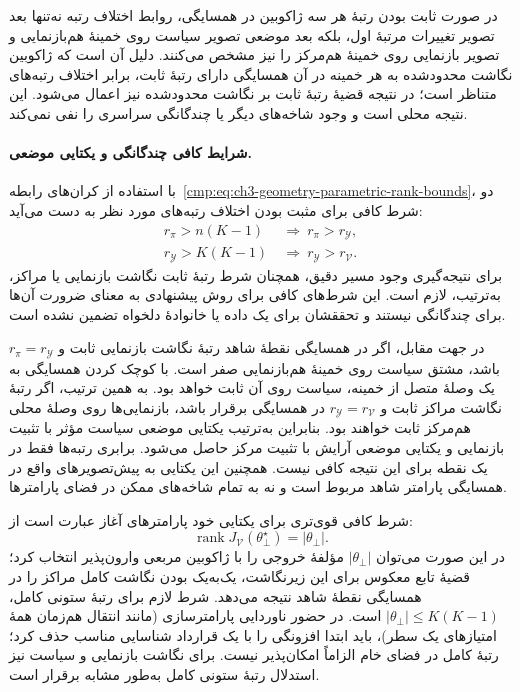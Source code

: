 در صورت ثابت بودن رتبهٔ هر سه ژاکوبین در همسایگی، روابط اختلاف رتبه نه‌تنها بعد تصویر تغییرات مرتبهٔ اول، بلکه بعد موضعی تصویر سیاست روی خمینهٔ هم‌بازنمایی و تصویر بازنمایی روی خمینهٔ هم‌مرکز را نیز مشخص می‌کنند. دلیل آن است که ژاکوبین نگاشت محدودشده به هر خمینه در آن همسایگی دارای رتبهٔ ثابت، برابر اختلاف رتبه‌های متناظر است؛ در نتیجه قضیهٔ رتبهٔ ثابت بر نگاشت محدودشده نیز اعمال می‌شود. این نتیجه محلی است و وجود شاخه‌های دیگر یا چندگانگی سراسری را نفی نمی‌کند.

\paragraph{شرایط کافی چندگانگی و یکتایی موضعی.}
با استفاده از کران‌های رابطه~\eqref{cmp:eq:ch3-geometry-parametric-rank-bounds}، دو شرط کافی برای مثبت بودن اختلاف رتبه‌های مورد نظر به دست می‌آید:
\begin{equation}\label{cmp:eq:ch3-geometry-parametric-multiple-sufficient}
\begin{aligned}
r_\pi>n(K-1)&\ \Longrightarrow\ r_\pi>r_{\mathscr Y},\\
r_{\mathscr Y}>K(K-1)&\ \Longrightarrow\ r_{\mathscr Y}>r_{\mathcal V}.
\end{aligned}
\end{equation}
برای نتیجه‌گیری وجود مسیر دقیق، همچنان شرط رتبهٔ ثابت نگاشت بازنمایی یا مراکز، به‌ترتیب، لازم است. این شرط‌های کافی برای روش پیشنهادی به معنای ضرورت آن‌ها برای چندگانگی نیستند و تحققشان برای یک داده یا خانوادهٔ دلخواه تضمین نشده است.

در جهت مقابل، اگر در همسایگی نقطهٔ شاهد رتبهٔ نگاشت بازنمایی ثابت و $r_\pi=r_{\mathscr Y}$ باشد، مشتق سیاست روی خمینهٔ هم‌بازنمایی صفر است. با کوچک کردن همسایگی به یک وصلهٔ متصل از خمینه، سیاست روی آن ثابت خواهد بود. به همین ترتیب، اگر رتبهٔ نگاشت مراکز ثابت و $r_{\mathscr Y}=r_{\mathcal V}$ در همسایگی برقرار باشد، بازنمایی‌ها روی وصلهٔ محلی هم‌مرکز ثابت خواهند بود. بنابراین به‌ترتیب یکتایی موضعی سیاست مؤثر با تثبیت بازنمایی و یکتایی موضعی آرایش با تثبیت مرکز حاصل می‌شود. برابری رتبه‌ها فقط در یک نقطه برای این نتیجه کافی نیست. همچنین این یکتایی به پیش‌تصویرهای واقع در همسایگی پارامتر شاهد مربوط است و نه به تمام شاخه‌های ممکن در فضای پارامترها.

شرط کافی قوی‌تری برای یکتایی خود پارامترهای آغاز عبارت است از:
\begin{equation}\label{cmp:eq:ch3-geometry-parametric-full-rank-unique}
\operatorname{rank}J_{\mathcal V}(\theta_\bot^\star)=|\theta_\bot|.
\end{equation}
در این صورت می‌توان $|\theta_\bot|$ مؤلفهٔ خروجی را با ژاکوبین مربعی وارون‌پذیر انتخاب کرد؛ قضیهٔ تابع معکوس برای این زیرنگاشت، یک‌به‌یک بودن نگاشت کامل مراکز را در همسایگی نقطهٔ شاهد نتیجه می‌دهد. شرط لازم برای رتبهٔ ستونی کامل، $|\theta_\bot|\le K(K-1)$ است. در حضور ناوردایی پارامترسازی (مانند انتقال هم‌زمان همهٔ امتیازهای یک سطر)، باید ابتدا افزونگی را با یک قرارداد شناسایی مناسب حذف کرد؛ رتبهٔ کامل در فضای خام الزاماً امکان‌پذیر نیست. برای نگاشت بازنمایی و سیاست نیز استدلال رتبهٔ ستونی کامل به‌طور مشابه برقرار است.

